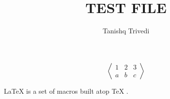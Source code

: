 \documentclass[10pt]{article}
\author{Tanishq Trivedi}
\title{TEST FILE}
\begin{document}
\maketitle
\[
\left\langle
\begin{matrix}
1 & 2 & 3\\
a & b & c
\end{matrix}
\right\rangle
\]

\LaTeX{} \cite{latex2e} is a set of macros built atop \TeX{} \cite{texbook}.
 
\end{document}
